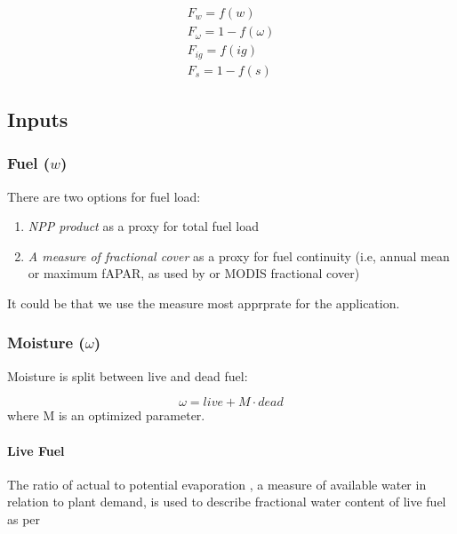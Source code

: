 \begin{equation}
    \begin{split}
        F_{w} = f(w) \\
        F_{\omega} = 1 - f(\omega) \\
        F_{ig} = f(ig) \\
        F_{s} = 1- f(s)
    \end{split}
\end{equation}

\subsection{Inputs}

\subsubsection{Fuel ($w$)}
There are two options for fuel load:
\begin{enumerate}
    \item \textit{NPP product} as a proxy for total fuel load
    \item \textit{A measure of fractional cover} as a proxy for fuel continuity (i.e, annual mean or maximum fAPAR, as used by \citet{knorr2014impact,knorr2016climate} or MODIS fractional cover)
\end{enumerate}

It could be that we use the measure most apprprate for the application.


\subsubsection{Moisture ($\omega$)}

Moisture is split between live and dead fuel:

\begin{equation}
    \omega = live + M \cdot dead
\end{equation}
where M is an optimized parameter.

\paragraph{Live Fuel}


The ratio of actual to potential evaporation \citep[$\alpha$][]{prentice1993simulation}, a measure of available water in relation to plant demand, is used to describe fractional water content of live fuel as per \citet{harrison2010fire, bistinas2014causal}

